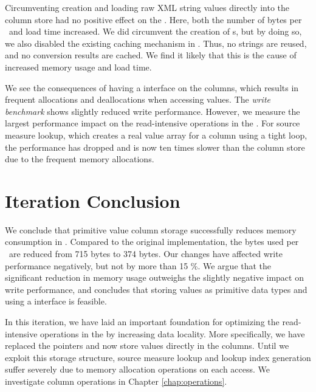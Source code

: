 Circumventing  creation and loading raw XML string values directly into the column store had no positive effect on the \tpchdl. Here, both the number of bytes per \lineitem~and load time increased. We did circumvent the creation of s, but by doing so, we also disabled the existing caching mechanism in \gap. Thus, no strings are reused, and no conversion results are cached. We find it likely that this is the cause of increased memory usage and load time.

We see the consequences of having a  interface on the columns, which results in frequent allocations and deallocations when accessing values. The \textit{write benchmark} shows slightly reduced write performance. However, we measure the largest performance impact on the read-intensive operations in the \tpchdl. For source measure lookup, which creates a real value array for a column using a tight loop, the performance has dropped and is now ten times slower than the  column store due to the frequent memory allocations.


\section{Iteration Conclusion}
\label{sec:Iteration Conclusion}
We conclude that primitive value column storage successfully reduces memory consumption in \gap. Compared to the original implementation, the bytes used per \lineitem~are reduced from 715 bytes to 374 bytes. Our changes have affected write performance negatively, but not by more than 15 \%. We argue that the significant reduction in memory usage outweighs the slightly negative impact on write performance, and concludes that storing values as primitive data types and using a  interface is feasible. 

In this iteration, we have laid an important foundation for optimizing the read-intensive operations in the \tpchdl by increasing data locality. More specifically, we have replaced the  pointers and now store values directly in the columns. Until we exploit this storage structure, source measure lookup and lookup index generation suffer severely due to memory allocation operations on each access. We investigate column operations in Chapter \ref{chap:operations}.


